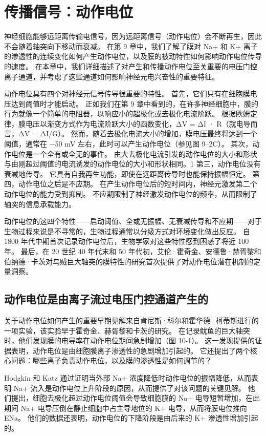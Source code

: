\chapter{传播信号：动作电位}
神经细胞能够远距离传输电信号，因为远距离信号（动作电位）会不断再生，因此不会随着轴突向下移动而衰减。 在第 9 章中，我们了解了膜对 Na+ 和 K+ 离子的渗透性的连续变化如何产生动作电位，以及膜的被动特性如何影响动作电位传导的速度。 在本章中，我们详细描述了对产生和传播动作电位至关重要的电压门控离子通道，并考虑了这些通道如何影响神经元电兴奋性的重要特征。

动作电位具有四个对神经元信号传导很重要的特性。 首先，它们只有在细胞膜电压达到阈值时才能启动。 正如我们在第 9 章中看到的，在许多神经细胞中，膜的行为就像一个简单的电阻器，以响应小的超极化或去极化电流阶跃。 根据欧姆定律，膜电压以渐变方式作为电流阶跃大小的函数变化，ΔV = ΔI · R（就电导而言，ΔV = ΔI/G）。 然而，随着去极化电流大小的增加，膜电压最终将达到一个阈值，通常在 −50 mV 左右，此时可以产生动作电位（参见图 9–2C）。 其次，动作电位是一个全有或全无的事件。 由大去极化电流引发的动作电位的大小和形状与由刚超过阈值的电流诱发的动作电位的大小和形状相同。1 第三，动作电位没有衰减地传导。 它具有自我再生功能，即使在远距离传导时也能保持振幅恒定。 第四，动作电位之后是不应期。 在产生动作电位后的短时间内，神经元激发第二个动作电位的能力受到抑制。 不应期限制了神经激发动作电位的频率，从而限制了轴突的信息承载能力。

动作电位的这四个特性——启动阈值、全或无振幅、无衰减传导和不应期——对于生物过程来说是不寻常的，生物过程通常以分级方式对环境变化做出反应。 自 1800 年代中期首次记录动作电位后，生物学家对这些特性感到困惑了将近 100 年。 最后，在 20 世纪 40 年代末和 50 年代初，艾伦·霍奇金、安德鲁·赫胥黎和伯纳德·卡茨对乌贼巨大轴突的膜特性的研究首次提供了对动作电位潜在机制的定量洞察。

\section{动作电位是由离子流过电压门控通道产生的}
关于动作电位如何产生的重要早期见解来自肯尼斯·科尔和霍华德·柯蒂斯进行的一项实验，该实验早于霍奇金、赫胥黎和卡茨的研究。 在记录鱿鱼的巨大轴突时，他们发现膜的电导率在动作电位期间急剧增加（图 10-1）。 这一发现提供的证据表明，动作电位是由细胞膜离子渗透性的急剧增加引起的。 它还提出了两个核心问题：哪些离子负责动作电位，以及膜的渗透性是如何调节的？

Hodgkin 和 Katz 通过证明当外部 Na+ 浓度降低时动作电位的振幅降低，从而表明 Na+ 流入是动作电位上升阶段的原因，从而提供了对该问题的关键见解。 他们提出，细胞去极化超过动作电位阈值会导致细胞膜的 Na+ 电导短暂增加，在此期间 Na+ 电导压倒在静止细胞中占主导地位的 K+ 电导，从而将膜电位推向 ENa。 他们的数据还表明，动作电位的下降阶段是由后来的 K+ 渗透性增加引起的。

